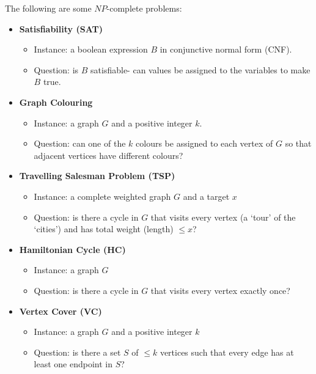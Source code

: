 \documentclass[a4paper, openany]{memoir}
\begin{document}
    The following are some $NP$-complete problems:
    \begin{itemize}
        \item \textbf{Satisfiability (SAT)}
        \begin{itemize}
            \item Instance: a boolean expression $B$ in conjunctive normal form (CNF).
            \item Question: is $B$ satisfiable- can values be assigned to the variables to make $B$ true.
        \end{itemize}

        \item \textbf{Graph Colouring}
        \begin{itemize}
            \item Instance: a graph $G$ and a positive integer $k$.
            \item Question: can one of the $k$ colours be assigned to each vertex of $G$ so that adjacent vertices have different colours?
        \end{itemize}

        \item \textbf{Travelling Salesman Problem (TSP)}
        \begin{itemize}
            \item Instance: a complete weighted graph $G$ and a target $x$
            \item Question: is there a cycle in $G$ that visits every vertex (a `tour' of the `cities') and has total weight (length) $\leq x$?
        \end{itemize}

        \item \textbf{Hamiltonian Cycle (HC)}
        \begin{itemize}
            \item Instance: a graph $G$
            \item Question: is there a cycle in $G$ that visits every vertex exactly once?
        \end{itemize}

        \item \textbf{Vertex Cover (VC)}
        \begin{itemize}
            \item Instance: a graph $G$ and a positive integer $k$
            \item Question: is there a set $S$ of $\leq k$ vertices such that every edge has at least one endpoint in $S$?
        \end{itemize}


\end{itemize}
\end{document}
